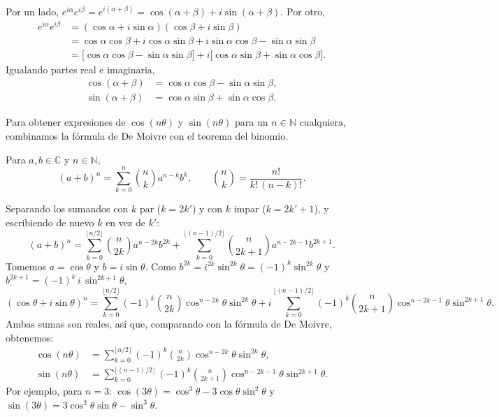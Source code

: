 \documentclass[12pt,a4paper]{book}
\begin{document}
  \begin{solucion}
    Por un lado, $e^{i\alpha}e^{i\beta}=e^{i(\alpha+\beta)}=\cos(\alpha+\beta)+i\sin(\alpha+\beta)$. Por otro,
    \begin{align*}
      e^{i\alpha}e^{i\beta} & =(\cos\alpha+i\sin\alpha)(\cos\beta+i\sin\beta)                                                         \\
                            & =\cos\alpha\cos\beta+i\cos\alpha\sin\beta+i\sin\alpha\cos\beta-\sin\alpha\sin\beta                      \\
                            & =\big[\cos\alpha\cos\beta-\sin\alpha\sin\beta\big]+i\big[\cos\alpha\sin\beta+\sin\alpha\cos\beta\big].
    \end{align*}
    Igualando partes real e imaginaria,
    \begin{align*}
      \cos(\alpha+\beta) & =\cos\alpha\cos\beta-\sin\alpha\sin\beta, \\
      \sin(\alpha+\beta) & =\cos\alpha\sin\beta+\sin\alpha\cos\beta.
    \end{align*}
  \end{solucion}

  Para obtener expresiones de $\cos(n\theta)$ y $\sin(n\theta)$ para un $n\in\mathbb{N}$ cualquiera, combinamos la fórmula de De Moivre con el teorema del binomio.

  \begin{teorema}
    Para $a,b\in\mathbb{C}$ y $n\in\mathbb{N}$,
    \begin{equation*}
      (a+b)^n=\sum_{k=0}^{n}\binom{n}{k}a^{n-k}b^k, \qquad \binom{n}{k}=\frac{n!}{k!\,(n-k)!}.
    \end{equation*}
  \end{teorema}

  Separando los sumandos con $k$ par ($k=2k'$) y con $k$ impar ($k=2k'+1$), y escribiendo de nuevo $k$ en vez de $k'$:
  \begin{equation*}
    (a+b)^n=\sum_{k=0}^{\lfloor n/2\rfloor}\binom{n}{2k}a^{n-2k}b^{2k}+\sum_{k=0}^{\lfloor (n-1)/2\rfloor}\binom{n}{2k+1}a^{n-2k-1}b^{2k+1}.
  \end{equation*}
  Tomemos $a=\cos\theta$ y $b=i\sin\theta$. Como $b^{2k}=i^{2k}\sin^{2k}\theta=(-1)^k\sin^{2k}\theta$ y $b^{2k+1}=(-1)^k\,i\,\sin^{2k+1}\theta$,
  \begin{equation*}
    (\cos\theta+i\sin\theta)^n=\sum_{k=0}^{\lfloor n/2\rfloor}(-1)^k\binom{n}{2k}\cos^{n-2k}\theta\sin^{2k}\theta+i\sum_{k=0}^{\lfloor (n-1)/2\rfloor}(-1)^k\binom{n}{2k+1}\cos^{n-2k-1}\theta\sin^{2k+1}\theta.
  \end{equation*}
  Ambas sumas son reales, así que, comparando con la fórmula de De Moivre, obtenemos:
  \begin{align*}
    \cos(n\theta) & =\sum_{k=0}^{\lfloor n/2\rfloor}(-1)^k\binom{n}{2k}\cos^{n-2k}\theta\sin^{2k}\theta,         \\
    \sin(n\theta) & =\sum_{k=0}^{\lfloor (n-1)/2\rfloor}(-1)^k\binom{n}{2k+1}\cos^{n-2k-1}\theta\sin^{2k+1}\theta.
  \end{align*}
  Por ejemplo, para $n=3$: $\cos(3\theta)=\cos^3\theta-3\cos\theta\sin^2\theta$ y $\sin(3\theta)=3\cos^2\theta\sin\theta-\sin^3\theta$.
\end{document}

